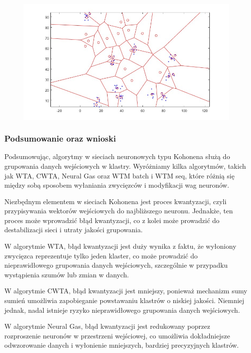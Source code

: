 \documentclass[11pt]{article}
\begin{document}
\begin{figure}[h!]
  \includegraphics{screeny/NeuralGas/Neural_gasp_10_groups/Neural_gasp_Areas.jpg}
\end{figure}

\hypertarget{podsumowanie-oraz-wnioski}{%
\subsubsection{Podsumowanie oraz
wnioski}\label{podsumowanie-oraz-wnioski}}

Podsumowując, algorytmy w sieciach neuronowych typu Kohonena służą do
grupowania danych wejściowych w klastry. Wyróżniamy kilka algorytmów,
takich jak WTA, CWTA, Neural Gas oraz WTM batch i WTM seq, które różnią
się między sobą sposobem wyłaniania zwycięzców i modyfikacji wag
neuronów.

Niezbędnym elementem w sieciach Kohonena jest proces kwantyzacji, czyli
przypisywania wektorów wejściowych do najbliższego neuronu. Jednakże,
ten proces może wprowadzić błąd kwantyzacji, co z kolei może prowadzić
do destabilizacji sieci i utraty jakości grupowania.

W algorytmie WTA, błąd kwantyzacji jest duży wynika z faktu, że
wyłoniony zwycięzca reprezentuje tylko jeden klaster, co może prowadzić
do nieprawidłowego grupowania danych wejściowych, szczególnie w
przypadku wystąpienia szumów lub zmian w danych.

W algorytmie CWTA, błąd kwantyzacji jest mniejszy, ponieważ mechanizm
sumy sumień umożliwia zapobieganie powstawaniu klastrów o niskiej
jakości. Niemniej jednak, nadal istnieje ryzyko nieprawidłowego
grupowania danych wejściowych.

W algorytmie Neural Gas, błąd kwantyzacji jest redukowany poprzez
rozproszenie neuronów w przestrzeni wejściowej, co umożliwia
dokładniejsze odwzorowanie danych i wyłonienie mniejszych, bardziej
precyzyjnych klastrów.
\end{document}
